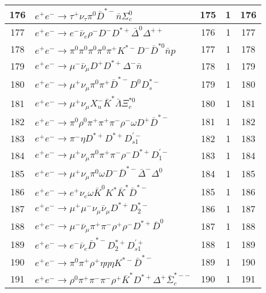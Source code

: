 \documentclass[landscape]{article}
\begin{document}
\begin{table}[htbp!]
\begin{tabular}{|c|>{\centering}p{18cm}|c|c|c|}
\hline
176 & $ e^{+} e^{-} \rightarrow \tau^{+} \nu_{\tau} \pi^{0} \bar{D}^{*-} \bar{n} \Sigma_{c}^{0} $ & 175 & 1 & 176 \\
\hline
177 & $ e^{+} e^{-} \rightarrow e^{-} \bar{\nu}_{e} \rho^{-} D^{-} D^{*+} \bar{\Delta}^{0} \Delta^{++} $ & 176 & 1 & 177 \\
\hline
178 & $ e^{+} e^{-} \rightarrow \pi^{0} \pi^{0} \pi^{0} \pi^{0} \pi^{+} K^{*-} D^{-} \bar{D}^{*0} \bar{n} p $ & 177 & 1 & 178 \\
\hline
179 & $ e^{+} e^{-} \rightarrow \mu^{-} \bar{\nu}_{\mu} D^{+} D^{*+} \Delta^{-} \bar{n} $ & 178 & 1 & 179 \\
\hline
180 & $ e^{+} e^{-} \rightarrow \mu^{+} \nu_{\mu} \pi^{0} \pi^{+} \bar{D}^{*-} D^{0} D_{s}^{*-} $ & 179 & 1 & 180 \\
\hline
181 & $ e^{+} e^{-} \rightarrow \mu^{+} \nu_{\mu} X_{u}^{-} \bar{K}^{*} \bar{\Lambda} \Xi_{c}^{*0} $ & 180 & 1 & 181 \\
\hline
182 & $ e^{+} e^{-} \rightarrow \pi^{0} \rho^{0} \pi^{+} \pi^{+} \pi^{-} \rho^{-} \omega D^{+} \bar{D}^{*-} $ & 181 & 1 & 182 \\
\hline
183 & $ e^{+} e^{-} \rightarrow \pi^{-} \eta D^{*+} D^{*+} D_{s1}^{\prime-} $ & 182 & 1 & 183 \\
\hline
184 & $ e^{+} e^{-} \rightarrow \mu^{+} \nu_{\mu} \pi^{0} \pi^{+} \pi^{-} \rho^{-} D^{*+} D_{1}^{\prime-} $ & 183 & 1 & 184 \\
\hline
185 & $ e^{+} e^{-} \rightarrow \mu^{+} \nu_{\mu} \pi^{0} \omega D^{-} \bar{D}^{*-} \bar{\Delta}^{-} \Delta^{0} $ & 184 & 1 & 185 \\
\hline
186 & $ e^{+} e^{-} \rightarrow e^{+} \nu_{e} \omega \bar{K}^{0} K^{*} \bar{K}^{*} \bar{D}^{*-} $ & 185 & 1 & 186 \\
\hline
187 & $ e^{+} e^{-} \rightarrow \mu^{+} \mu^{-} \nu_{\mu} \bar{\nu}_{\mu} D^{*+} D_{2}^{*-} $ & 186 & 1 & 187 \\
\hline
188 & $ e^{+} e^{-} \rightarrow \mu^{-} \bar{\nu}_{\mu} \pi^{+} \pi^{-} \rho^{+} \rho^{-} D^{*+} \bar{D}^{0} $ & 187 & 1 & 188 \\
\hline
189 & $ e^{+} e^{-} \rightarrow e^{-} \bar{\nu}_{e} \bar{D}^{*-} D_{2}^{*+} D_{s1}^{\prime+} $ & 188 & 1 & 189 \\
\hline
190 & $ e^{+} e^{-} \rightarrow \pi^{0} \pi^{+} \rho^{+} \eta \eta \eta K^{*-} \bar{D}^{*-} $ & 189 & 1 & 190 \\
\hline
191 & $ e^{+} e^{-} \rightarrow \rho^{0} \pi^{+} \pi^{-} \pi^{-} \rho^{+} \bar{K}^{*} D^{*+} \Delta^{+} \bar{\Sigma}_{c}^{*--} $ & 190 & 1 & 191 \\

\end{tabular}
\end{table}
\end{document}
